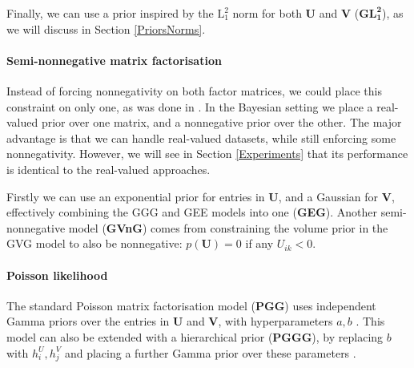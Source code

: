 \documentclass[letterpaper]{article} %
\newcommand{\U}{\boldsymbol U}
\newcommand{\V}{\boldsymbol V}
\begin{document}
			Finally, we can use a prior inspired by the $\text{L}^2_1$ norm for both $\U$ and $\V$ (\textbf{G$\boldsymbol{\text{L}^2_1}$}), as we will discuss in Section \ref{PriorsNorms}.
			
		\paragraph{Semi-nonnegative matrix factorisation} 
			Instead of forcing nonnegativity on both factor matrices, we could place this constraint on only one, as was done in \cite{FeiWangTaoLi2008,Ding2010}. In the Bayesian setting we place a real-valued prior over one matrix, and a nonnegative prior over the other. The major advantage is that we can handle real-valued datasets, while still enforcing some nonnegativity. However, we will see in Section \ref{Experiments} that its performance is identical to the real-valued approaches.
			
			Firstly we can use an exponential prior for entries in $\U$, and a Gaussian for $\V$, effectively combining the GGG and GEE models into one (\textbf{GEG}). 
			Another semi-nonnegative model (\textbf{GVnG}) comes from constraining the volume prior in the GVG model to also be nonnegative: $p(\U) = 0$ if any $U_{ik} < 0$.
			
		\paragraph{Poisson likelihood}
			The standard Poisson matrix factorisation model (\textbf{PGG}) uses independent Gamma priors over the entries in $\U$ and $\V$, with hyperparameters $a, b$ \cite{Gopalan2014,Gopalan2015,Hu2015}. 
			This model can also be extended with a hierarchical prior (\textbf{PGGG}), by replacing $b$ with $h^U_i, h^V_j$ and placing a further Gamma prior over these parameters \cite{Gopalan2015}.
\end{document}
